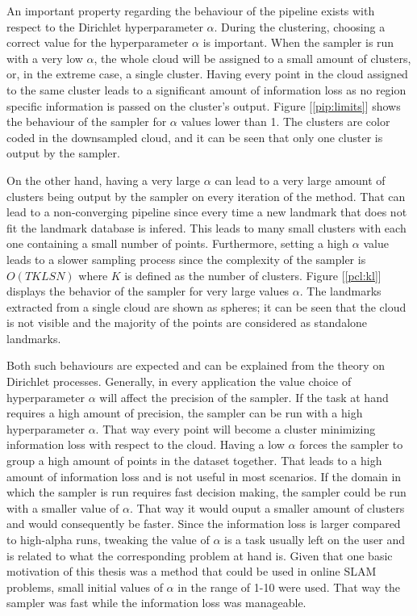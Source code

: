 \documentclass [twoside,hidelinks]{article}
\begin{document}
An important property regarding the behaviour of the pipeline exists with respect to the Dirichlet hyperparameter $\alpha$. During the clustering, choosing a correct value for the hyperparameter $\alpha$ is important. When the sampler is run with a very low $\alpha$, the whole cloud will be assigned to a small amount of clusters, or, in the extreme case, a single cluster. Having every point in the cloud assigned to the same cluster leads to a significant amount of information loss as no region specific information is passed on the cluster's output. Figure  [\ref{pip:limits}] shows the behaviour of the sampler for $\alpha$ values lower than 1. The clusters are color coded in the downsampled cloud, and it can be seen that only one cluster is output by the sampler.

On the other hand, having a very large $\alpha$ can lead to a very large amount of clusters being output by the sampler on every iteration of the method. That can lead to a non-converging pipeline since every time a new landmark that does not fit the landmark database is infered. This leads to many small clusters with each one containing a small number of points. Furthermore, setting a high $\alpha$ value leads to a slower sampling process since the complexity of the sampler is $O (TKLSN)$ where $K$ is defined as the number of clusters. Figure  [\ref{pcl:kl}] displays the behavior of the sampler for very large values $\alpha$. The landmarks extracted from a single cloud are shown as spheres; it can be seen that the cloud is not visible and the majority of the points are considered as standalone landmarks.

Both such behaviours are expected and can be explained from the theory on Dirichlet processes\cite{dependent}. Generally, in every application the value choice of hyperparameter $\alpha$ will affect the precision of the sampler. If the task at hand requires a high amount of precision, the sampler can be run with a high hyperparameter $\alpha$. That way every point will become a cluster minimizing information loss with respect to the cloud. Having a low $\alpha$ forces the sampler to group a high amount of points in the dataset together. That leads to a high amount of information loss and is not useful in most scenarios. If the domain in which the sampler is run requires fast decision making, the sampler could be run with a smaller value of $\alpha$. That way it would ouput a smaller amount of clusters and would consequently be faster. Since the information loss is larger compared to high-alpha runs, tweaking the value of $\alpha$ is a task usually left on the user and is related to  what the corresponding problem at hand is. Given that one basic motivation of this thesis was a method that could be used in online SLAM problems, small initial values of $\alpha$ in the range of 1-10 were used. That way the sampler was fast while the information loss was manageable.
\end{document}
